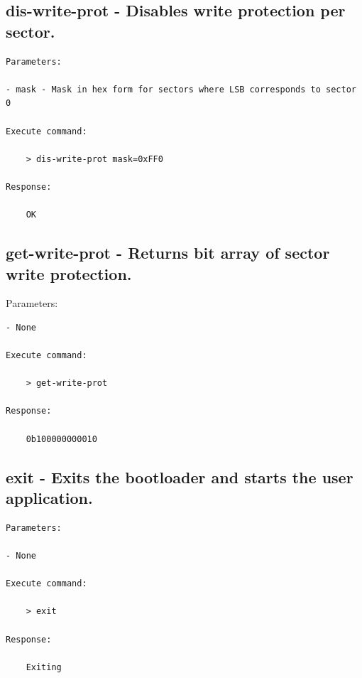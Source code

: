 \subsection{dis-write-prot - Disables write protection per sector.}
\label{bl_cmd:dis-write-prot}

\begin{lstlisting}
Parameters:

- mask - Mask in hex form for sectors where LSB corresponds to sector 0

Execute command: 

    > dis-write-prot mask=0xFF0
    
Response: 

    OK
\end{lstlisting}

\subsection{get-write-prot - Returns bit array of sector write protection.}
\label{bl_cmd:get-write-prot}Parameters:

\begin{lstlisting}
- None

Execute command: 

    > get-write-prot
    
Response: 

    0b100000000010
\end{lstlisting}

\subsection{exit - Exits the bootloader and starts the user application.}
\label{bl_cmd:exit}

\begin{lstlisting}
Parameters:

- None

Execute command: 

    > exit  
    
Response: 

    Exiting
\end{lstlisting}

